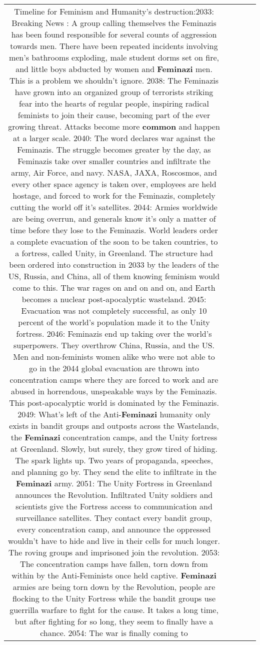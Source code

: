\documentclass[11pt]{article}
\newlength\mylength
\begin{document}
\begin{center}
\begin{longtable}{|C{.65\mylength}|C{.30\mylength}|C{.12\mylength}|C{.12\mylength}|C{.12\mylength}|}
  \small Timeline for Feminism and Humanity's destruction:2033:  Breaking News : A group calling themselves the Feminazis has been found responsible for several counts of aggression towards men. There have been repeated incidents involving men's bathrooms exploding, male student dorms set on fire, and little boys abducted by women and \textbf{Feminazi} men. This is a problem we shouldn't ignore. 2038: The Feminazis have grown into an organized group of terrorists striking fear into the hearts of regular people, inspiring radical feminists to join their cause, becoming part of the ever growing threat. Attacks become more \textbf{common} and happen at a larger scale. 2040: The word declares war against the Feminazis. The struggle becomes greater by the day, as Feminazis take over smaller countries and infiltrate the army, Air Force, and navy. NASA, JAXA, Roscosmos, and every other space agency is taken over, employees are held hostage, and forced to work for the Feminazis, completely cutting the world off it's satellites. 2044: Armies worldwide are being overrun, and generals know it's only a matter of time before they lose to the Feminazis. World leaders order a complete evacuation of the soon to be taken countries, to a fortress, called Unity, in Greenland. The structure had been ordered into construction in 2033 by the leaders of the US, Russia, and China, all of them knowing feminism would come to this. The war rages on and on and on, and Earth becomes a nuclear post-apocalyptic wasteland. 2045: Evacuation was not completely successful, as only 10 percent of the world's population made it to the Unity fortress. 2046: Feminazis end up taking over the world's superpowers. They overthrow China, Russia, and the US. Men and non-feminists women alike who were not able to go in the 2044 global evacuation are thrown into concentration camps where they are forced to work and are abused in horrendous, unspeakable ways by the Feminazis. This post-apocalyptic world is dominated by the Feminazis. 2049: What's left of the Anti-\textbf{Feminazi} humanity only exists in bandit groups and outposts across the Wastelands, the \textbf{Feminazi} concentration camps, and the Unity fortress at Greenland. Slowly, but surely, they grow tired of hiding. The spark lights up. Two years of propaganda, speeches, and planning go by. They send the elite to infiltrate in the \textbf{Feminazi} army. 2051: The Unity Fortress in Greenland announces the Revolution. Infiltrated Unity soldiers and scientists give the Fortress access to communication and surveillance satellites. They contact every bandit group, every concentration camp, and announce the oppressed wouldn't have to hide and live in their cells for much longer. The roving groups and imprisoned join the revolution. 2053: The concentration camps have fallen, torn down from within by the Anti-Feminists once held captive. \textbf{Feminazi} armies are being torn down by the Revolution, people are flocking to the Unity Fortress while the bandit groups use guerrilla warfare to fight for the cause. It takes a long time, but after fighting for so long, they seem to finally have a chance. 2054: The war is finally coming to 
\end{longtable}
\end{center}
\end{document}
